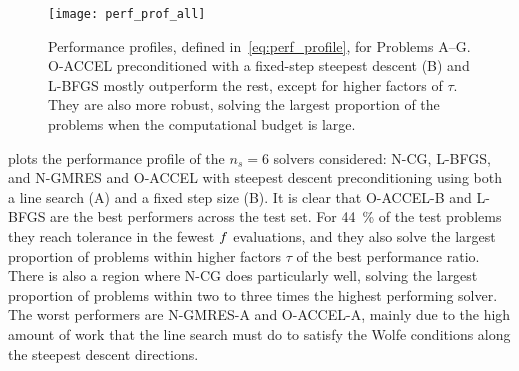 \documentclass[main.tex]{subfiles}
\begin{document}
\begin{figure}[ht]
  \centering
  \texttt{[image: perf\_prof\_all]}
  \caption[Performance profiles for Problems A--G]{Performance profiles, defined in~\eqref{eq:perf_profile},
    for Problems A--G.
    O-ACCEL preconditioned with a fixed-step steepest descent (B) and
    L-BFGS mostly
    outperform the rest, except for higher factors of $\tau$. They are
    also more robust, solving the largest proportion
    of the problems when the computational budget is large.
  }\label{fig:perf_prof_all}
\end{figure}
 plots the performance profile of the $n_s=6$
solvers considered: N-CG, L-BFGS, and N-GMRES and O-ACCEL with
steepest descent preconditioning using both a line search (A) and a
fixed step size (B).  It is clear that O-ACCEL-B and L-BFGS are the
best performers across the test set.  For \SI{44}{\percent} of the
test problems they reach tolerance in the fewest $f$ evaluations,
and they also solve the largest proportion of problems within higher
factors $\tau$ of the best performance ratio.  There is also a region
where N-CG does particularly well, solving the largest proportion of
problems within two to three times the highest performing solver.  The
worst performers are N-GMRES-A and O-ACCEL-A, mainly due to the high
amount of work that the line search must do to satisfy the Wolfe
conditions along the steepest descent directions.
\end{document}
